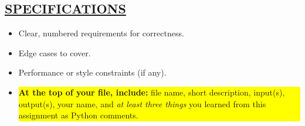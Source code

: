 \documentclass[11pt]{article}
\newcommand{\learnednote}{\colorbox{yellow}{%
\parbox{\dimexpr\linewidth-2\fboxsep}{\textbf{At the top of your file, include:}
file name, short description, input(s), output(s), your name, and
\emph{at least three things} you learned from this assignment as Python comments.}}}
\begin{document}
\subsection*{\underline{SPECIFICATIONS}}
\begin{itemize}
  \item Clear, numbered requirements for correctness.
  \item Edge cases to cover.
  \item Performance or style constraints (if any).
  \item \learnednote
\end{itemize}

\end{document}
